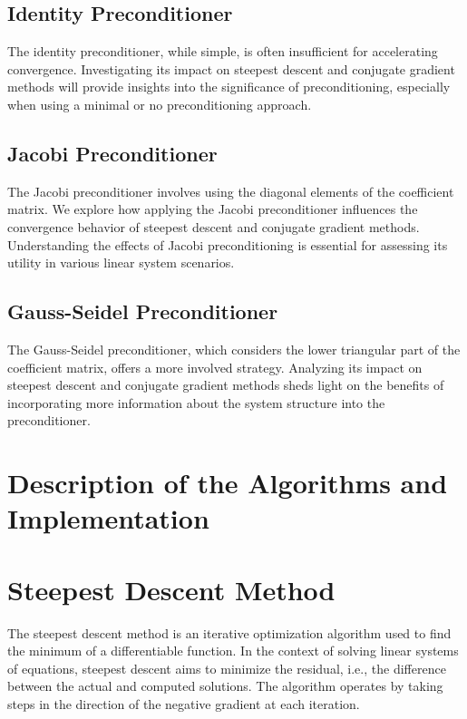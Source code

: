\documentclass[12pt, letterpaper]{article}
\begin{document}
\subsection*{Identity Preconditioner}
The identity preconditioner, while simple, is often insufficient for accelerating convergence. Investigating its impact on steepest descent and conjugate gradient methods will provide insights into the significance of preconditioning, especially when using a minimal or no preconditioning approach.

\subsection*{Jacobi Preconditioner}
The Jacobi preconditioner involves using the diagonal elements of the coefficient matrix. We explore how applying the Jacobi preconditioner influences the convergence behavior of steepest descent and conjugate gradient methods. Understanding the effects of Jacobi preconditioning is essential for assessing its utility in various linear system scenarios.

\subsection*{Gauss-Seidel Preconditioner}
The Gauss-Seidel preconditioner, which considers the lower triangular part of the coefficient matrix, offers a more involved strategy. Analyzing its impact on steepest descent and conjugate gradient methods sheds light on the benefits of incorporating more information about the system structure into the preconditioner.






\section{Description of the Algorithms and Implementation}

\section*{Steepest Descent Method}

The steepest descent method is an iterative optimization algorithm used to find the minimum of a differentiable function. In the context of solving linear systems of equations, steepest descent aims to minimize the residual, i.e., the difference between the actual and computed solutions. The algorithm operates by taking steps in the direction of the negative gradient at each iteration.
\end{document}
